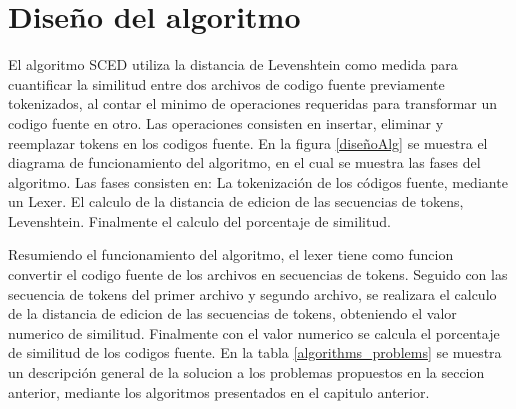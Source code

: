 

\section{Diseño del algoritmo}
El algoritmo SCED utiliza la distancia de Levenshtein como medida para cuantificar la similitud entre dos archivos de codigo fuente previamente tokenizados, al contar el minimo de operaciones requeridas para transformar un codigo fuente en otro. Las operaciones consisten en insertar, eliminar y reemplazar tokens en los codigos fuente. En la figura \ref{diseñoAlg} se muestra el diagrama de funcionamiento del algoritmo, en el cual se muestra las fases del algoritmo. Las fases consisten en: La tokenización de los códigos fuente, mediante un Lexer. El calculo de la distancia de edicion de las secuencias de tokens,  Levenshtein. Finalmente el calculo del porcentaje de similitud.



Resumiendo el funcionamiento del algoritmo, el lexer tiene como funcion convertir el codigo fuente de los archivos en secuencias de tokens. Seguido con las secuencia de tokens del primer archivo y segundo archivo, se realizara el calculo de la distancia de edicion de las secuencias de tokens, obteniendo el valor numerico de similitud. Finalmente con el valor numerico se calcula el porcentaje de similitud de los codigos fuente. En la tabla \ref{algorithms_problems} se muestra un descripción general de la solucion a los problemas propuestos en la seccion anterior, mediante los algoritmos presentados en el capitulo anterior.



